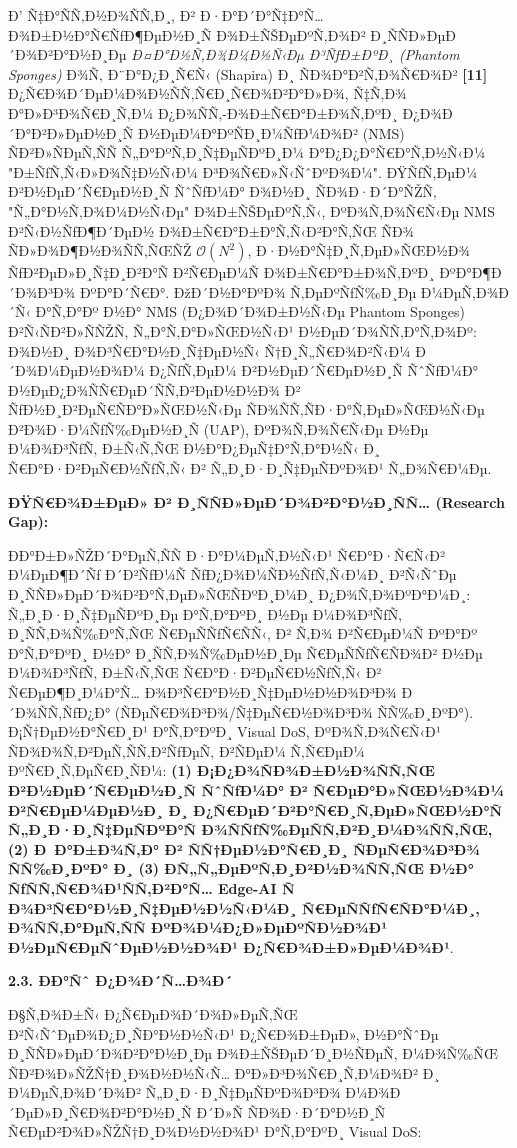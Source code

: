 \documentclass[]{article}
\begin{document}
Ð’ Ñ‡Ð°ÑÑ‚Ð½Ð¾ÑÑ‚Ð¸, Ð² Ð·Ð°Ð´Ð°Ñ‡Ð°Ñ… Ð¾Ð±Ð½Ð°Ñ€ÑƒÐ¶ÐµÐ½Ð¸Ñ Ð¾Ð±ÑŠÐµÐºÑ‚Ð¾Ð² Ð¸ÑÑÐ»ÐµÐ´Ð¾Ð²Ð°Ð½Ð¸Ðµ \emph{Ð¤Ð°Ð½Ñ‚Ð¾Ð¼Ð½Ñ‹Ðµ Ð³ÑƒÐ±ÐºÐ¸ (Phantom Sponges)} Ð¾Ñ‚ Ð¨Ð°Ð¿Ð¸Ñ€Ñ‹ (Shapira) Ð¸ ÑÐ¾Ð°Ð²Ñ‚Ð¾Ñ€Ð¾Ð² \textbf{{[}11{]}} Ð¿Ñ€Ð¾Ð´ÐµÐ¼Ð¾Ð½ÑÑ‚Ñ€Ð¸Ñ€Ð¾Ð²Ð°Ð»Ð¾, Ñ‡Ñ‚Ð¾ Ð°Ð»Ð³Ð¾Ñ€Ð¸Ñ‚Ð¼ Ð¿Ð¾ÑÑ‚-Ð¾Ð±Ñ€Ð°Ð±Ð¾Ñ‚ÐºÐ¸ Ð¿Ð¾Ð´Ð°Ð²Ð»ÐµÐ½Ð¸Ñ Ð½ÐµÐ¼Ð°ÐºÑÐ¸Ð¼ÑƒÐ¼Ð¾Ð² (NMS) ÑÐ²Ð»ÑÐµÑ‚ÑÑ Ñ„Ð°ÐºÑ‚Ð¸Ñ‡ÐµÑÐºÐ¸Ð¼ Ð°Ð¿Ð¿Ð°Ñ€Ð°Ñ‚Ð½Ñ‹Ð¼ "Ð±ÑƒÑ‚Ñ‹Ð»Ð¾Ñ‡Ð½Ñ‹Ð¼ Ð³Ð¾Ñ€Ð»Ñ‹ÑˆÐºÐ¾Ð¼". ÐŸÑƒÑ‚ÐµÐ¼ Ð²Ð½ÐµÐ´Ñ€ÐµÐ½Ð¸Ñ ÑˆÑƒÐ¼Ð° Ð¾Ð½Ð¸ ÑÐ¾Ð·Ð´Ð°ÑŽÑ‚ "Ñ„Ð°Ð½Ñ‚Ð¾Ð¼Ð½Ñ‹Ðµ" Ð¾Ð±ÑŠÐµÐºÑ‚Ñ‹, ÐºÐ¾Ñ‚Ð¾Ñ€Ñ‹Ðµ NMS Ð²Ñ‹Ð½ÑƒÐ¶Ð´ÐµÐ½ Ð¾Ð±Ñ€Ð°Ð±Ð°Ñ‚Ñ‹Ð²Ð°Ñ‚ÑŒ ÑÐ¾ ÑÐ»Ð¾Ð¶Ð½Ð¾ÑÑ‚ÑŒÑŽ \(\mathcal{O}\left( N^{2} \right)\), Ð·Ð½Ð°Ñ‡Ð¸Ñ‚ÐµÐ»ÑŒÐ½Ð¾ ÑƒÐ²ÐµÐ»Ð¸Ñ‡Ð¸Ð²Ð°Ñ Ð²Ñ€ÐµÐ¼Ñ Ð¾Ð±Ñ€Ð°Ð±Ð¾Ñ‚ÐºÐ¸ ÐºÐ°Ð¶Ð´Ð¾Ð³Ð¾ ÐºÐ°Ð´Ñ€Ð°. ÐžÐ´Ð½Ð°ÐºÐ¾ Ñ‚ÐµÐºÑƒÑ‰Ð¸Ðµ Ð¼ÐµÑ‚Ð¾Ð´Ñ‹ Ð°Ñ‚Ð°Ðº Ð½Ð° NMS (Ð¿Ð¾Ð´Ð¾Ð±Ð½Ñ‹Ðµ Phantom Sponges) Ð²Ñ‹ÑÐ²Ð»ÑÑŽÑ‚ Ñ„Ð°Ñ‚Ð°Ð»ÑŒÐ½Ñ‹Ð¹ Ð½ÐµÐ´Ð¾ÑÑ‚Ð°Ñ‚Ð¾Ðº: Ð¾Ð½Ð¸ Ð¾Ð³Ñ€Ð°Ð½Ð¸Ñ‡ÐµÐ½Ñ‹ Ñ†Ð¸Ñ„Ñ€Ð¾Ð²Ñ‹Ð¼ Ð´Ð¾Ð¼ÐµÐ½Ð¾Ð¼ Ð¿ÑƒÑ‚ÐµÐ¼ Ð²Ð½ÐµÐ´Ñ€ÐµÐ½Ð¸Ñ ÑˆÑƒÐ¼Ð° Ð½ÐµÐ¿Ð¾ÑÑ€ÐµÐ´ÑÑ‚Ð²ÐµÐ½Ð½Ð¾ Ð² ÑƒÐ½Ð¸Ð²ÐµÑ€ÑÐ°Ð»ÑŒÐ½Ñ‹Ðµ ÑÐ¾ÑÑ‚ÑÐ·Ð°Ñ‚ÐµÐ»ÑŒÐ½Ñ‹Ðµ Ð²Ð¾Ð·Ð¼ÑƒÑ‰ÐµÐ½Ð¸Ñ (UAP), ÐºÐ¾Ñ‚Ð¾Ñ€Ñ‹Ðµ Ð½Ðµ Ð¼Ð¾Ð³ÑƒÑ‚ Ð±Ñ‹Ñ‚ÑŒ Ð½Ð°Ð¿ÐµÑ‡Ð°Ñ‚Ð°Ð½Ñ‹ Ð¸ Ñ€Ð°Ð·Ð²ÐµÑ€Ð½ÑƒÑ‚Ñ‹ Ð² Ñ„Ð¸Ð·Ð¸Ñ‡ÐµÑÐºÐ¾Ð¹ Ñ„Ð¾Ñ€Ð¼Ðµ.

\textbf{ÐŸÑ€Ð¾Ð±ÐµÐ» Ð² Ð¸ÑÑÐ»ÐµÐ´Ð¾Ð²Ð°Ð½Ð¸ÑÑ… (Research Gap):}

ÐÐ°Ð±Ð»ÑŽÐ´Ð°ÐµÑ‚ÑÑ Ð·Ð°Ð¼ÐµÑ‚Ð½Ñ‹Ð¹ Ñ€Ð°Ð·Ñ€Ñ‹Ð² Ð¼ÐµÐ¶Ð´Ñƒ Ð´Ð²ÑƒÐ¼Ñ ÑƒÐ¿Ð¾Ð¼ÑÐ½ÑƒÑ‚Ñ‹Ð¼Ð¸ Ð²Ñ‹ÑˆÐµ Ð¸ÑÑÐ»ÐµÐ´Ð¾Ð²Ð°Ñ‚ÐµÐ»ÑŒÑÐºÐ¸Ð¼Ð¸ Ð¿Ð¾Ñ‚Ð¾ÐºÐ°Ð¼Ð¸: Ñ„Ð¸Ð·Ð¸Ñ‡ÐµÑÐºÐ¸Ðµ Ð°Ñ‚Ð°ÐºÐ¸ Ð½Ðµ Ð¼Ð¾Ð³ÑƒÑ‚ Ð¸ÑÑ‚Ð¾Ñ‰Ð°Ñ‚ÑŒ Ñ€ÐµÑÑƒÑ€ÑÑ‹, Ð² Ñ‚Ð¾ Ð²Ñ€ÐµÐ¼Ñ ÐºÐ°Ðº Ð°Ñ‚Ð°ÐºÐ¸ Ð½Ð° Ð¸ÑÑ‚Ð¾Ñ‰ÐµÐ½Ð¸Ðµ Ñ€ÐµÑÑƒÑ€ÑÐ¾Ð² Ð½Ðµ Ð¼Ð¾Ð³ÑƒÑ‚ Ð±Ñ‹Ñ‚ÑŒ Ñ€Ð°Ð·Ð²ÐµÑ€Ð½ÑƒÑ‚Ñ‹ Ð² Ñ€ÐµÐ¶Ð¸Ð¼Ð°Ñ… Ð¾Ð³Ñ€Ð°Ð½Ð¸Ñ‡ÐµÐ½Ð½Ð¾Ð³Ð¾ Ð´Ð¾ÑÑ‚ÑƒÐ¿Ð° (ÑÐµÑ€Ð¾Ð³Ð¾/Ñ‡ÐµÑ€Ð½Ð¾Ð³Ð¾ ÑÑ‰Ð¸ÐºÐ°). Ð¡Ñ†ÐµÐ½Ð°Ñ€Ð¸Ð¹ Ð°Ñ‚Ð°ÐºÐ¸ Visual DoS, ÐºÐ¾Ñ‚Ð¾Ñ€Ñ‹Ð¹ ÑÐ¾Ð¾Ñ‚Ð²ÐµÑ‚ÑÑ‚Ð²ÑƒÐµÑ‚ Ð²ÑÐµÐ¼ Ñ‚Ñ€ÐµÐ¼ ÐºÑ€Ð¸Ñ‚ÐµÑ€Ð¸ÑÐ¼: \textbf{(1) Ð¡Ð¿Ð¾ÑÐ¾Ð±Ð½Ð¾ÑÑ‚ÑŒ Ð²Ð½ÐµÐ´Ñ€ÐµÐ½Ð¸Ñ ÑˆÑƒÐ¼Ð° Ð² Ñ€ÐµÐ°Ð»ÑŒÐ½Ð¾Ð¼ Ð²Ñ€ÐµÐ¼ÐµÐ½Ð¸ Ð¸ Ð¿Ñ€ÐµÐ´Ð²Ð°Ñ€Ð¸Ñ‚ÐµÐ»ÑŒÐ½Ð°Ñ Ñ„Ð¸Ð·Ð¸Ñ‡ÐµÑÐºÐ°Ñ Ð¾ÑÑƒÑ‰ÐµÑÑ‚Ð²Ð¸Ð¼Ð¾ÑÑ‚ÑŒ, (2) Ð Ð°Ð±Ð¾Ñ‚Ð° Ð² ÑÑ†ÐµÐ½Ð°Ñ€Ð¸Ð¸ ÑÐµÑ€Ð¾Ð³Ð¾ ÑÑ‰Ð¸ÐºÐ° Ð¸ (3) Ð­Ñ„Ñ„ÐµÐºÑ‚Ð¸Ð²Ð½Ð¾ÑÑ‚ÑŒ Ð½Ð° ÑƒÑÑ‚Ñ€Ð¾Ð¹ÑÑ‚Ð²Ð°Ñ… Edge-AI Ñ Ð¾Ð³Ñ€Ð°Ð½Ð¸Ñ‡ÐµÐ½Ð½Ñ‹Ð¼Ð¸ Ñ€ÐµÑÑƒÑ€ÑÐ°Ð¼Ð¸, Ð¾ÑÑ‚Ð°ÐµÑ‚ÑÑ ÐºÐ¾Ð¼Ð¿Ð»ÐµÐºÑÐ½Ð¾Ð¹ Ð½ÐµÑ€ÐµÑˆÐµÐ½Ð½Ð¾Ð¹ Ð¿Ñ€Ð¾Ð±Ð»ÐµÐ¼Ð¾Ð¹}.

\textbf{2.3. ÐÐ°Ñˆ Ð¿Ð¾Ð´Ñ…Ð¾Ð´}

Ð§Ñ‚Ð¾Ð±Ñ‹ Ð¿Ñ€ÐµÐ¾Ð´Ð¾Ð»ÐµÑ‚ÑŒ Ð²Ñ‹ÑˆÐµÐ¾Ð¿Ð¸ÑÐ°Ð½Ð½Ñ‹Ð¹ Ð¿Ñ€Ð¾Ð±ÐµÐ», Ð½Ð°ÑˆÐµ Ð¸ÑÑÐ»ÐµÐ´Ð¾Ð²Ð°Ð½Ð¸Ðµ Ð¾Ð±ÑŠÐµÐ´Ð¸Ð½ÑÐµÑ‚ Ð¼Ð¾Ñ‰ÑŒ ÑÐ²Ð¾Ð»ÑŽÑ†Ð¸Ð¾Ð½Ð½Ñ‹Ñ… Ð°Ð»Ð³Ð¾Ñ€Ð¸Ñ‚Ð¼Ð¾Ð² Ð¸ Ð¼ÐµÑ‚Ð¾Ð´Ð¾Ð² Ñ„Ð¸Ð·Ð¸Ñ‡ÐµÑÐºÐ¾Ð³Ð¾ Ð¼Ð¾Ð´ÐµÐ»Ð¸Ñ€Ð¾Ð²Ð°Ð½Ð¸Ñ Ð´Ð»Ñ ÑÐ¾Ð·Ð´Ð°Ð½Ð¸Ñ Ñ€ÐµÐ²Ð¾Ð»ÑŽÑ†Ð¸Ð¾Ð½Ð½Ð¾Ð¹ Ð°Ñ‚Ð°ÐºÐ¸ Visual DoS:
\end{document}
